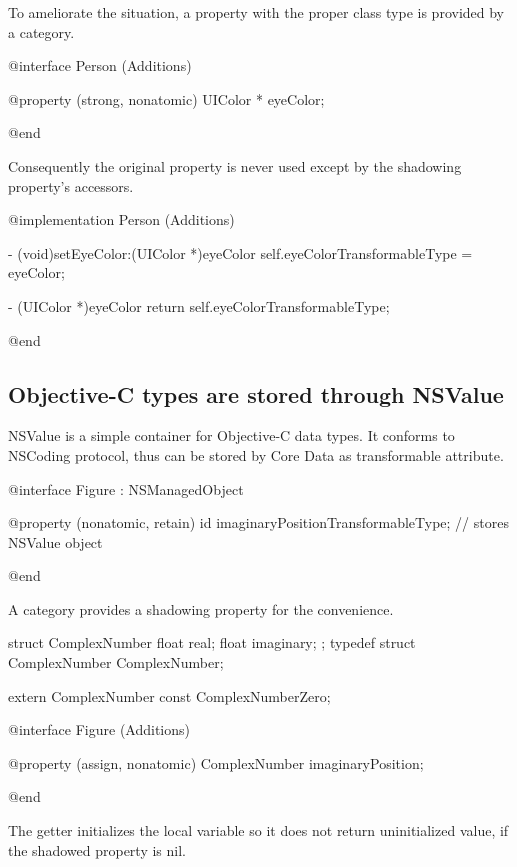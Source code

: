 \documentclass[10pt]{extarticle}
\newenvironment{codelisting}
{\footnotesize\mdframed[middlelinewidth=0.5pt, middlelinecolor=BaliHaiColor, skipabove=15pt]\verbatim}
{\endverbatim\endmdframed\vspace{12pt}\normalsize}
\begin{document}
To ameliorate the situation, a property with the proper class type is provided by a category.

\begin{codelisting}
@interface Person (Additions)

@property (strong, nonatomic) UIColor * eyeColor;

@end
\end{codelisting}

Consequently the original property is never used except by the shadowing property's accessors.

\begin{codelisting}
@implementation Person (Additions)

- (void)setEyeColor:(UIColor *)eyeColor
{
    self.eyeColorTransformableType = eyeColor;
}

- (UIColor *)eyeColor
{
    return self.eyeColorTransformableType;
}

@end
\end{codelisting}


\subsection{Objective-C types are stored through NSValue}

NSValue is a simple container for Objective-C data types. It conforms to NSCoding protocol, thus can be stored by Core Data as transformable attribute. 

\begin{codelisting}
@interface Figure : NSManagedObject

@property (nonatomic, retain) id imaginaryPositionTransformableType;	          // stores NSValue object

@end
\end{codelisting}

A category provides a shadowing property for the convenience.

\begin{codelisting}
struct ComplexNumber {
    float real;
    float imaginary;
};
typedef struct ComplexNumber ComplexNumber;

extern ComplexNumber const ComplexNumberZero;


@interface Figure (Additions)

@property (assign, nonatomic) ComplexNumber imaginaryPosition;

@end
\end{codelisting}

The getter initializes the local variable so it does not return uninitialized value, if the shadowed property is nil.
\end{document}
